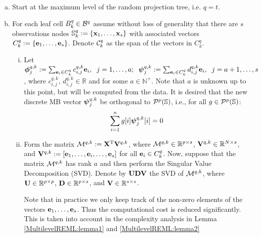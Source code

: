 \documentclass[11pt,final]{amsart}       %
\begin{document}
\begin{enumerate}[(a)]
\item Start at the maximum level of the random projection tree,
  i.e. $q = t$.
\item For each leaf cell $B^{q}_{k} \in {\mathcal B}^{q}$ assume without loss
  of generality that there are $s$ observations nodes $\mathbb{S}^{q}_{k}:=\{
  \mathbf{x}_1, \dots, \mathbf{x}_s \}$ with associated vectors $C_k^{q} := \{
  \mathbf{e}_1, \dots, \mathbf{e}_s \}$.
  Denote ${\mathcal C}^{q}_{k}$ as the span of the vectors in $C_k^{q}$.
\begin{enumerate}[i)]

\item Let $\boldsymbol{\phi}^{q,k} _{j} := \sum_{\mathbf{e}_i \in C^q_k} c^{q,k} _{i,j}
  \mathbf{e}_i, \hspace{2mm} j=1, \dots, a;
\hspace{2mm} \boldsymbol{\psi}^{q,k}_{j} := \sum_{\mathbf{e}_i \in C^q_k} d^{q,k}_{i,j}
\mathbf{e}_i, \hspace{2mm} j=a+1, \dots, s$, where $c^{q,k}_{i,j}$,
$d^{q,k}_{i,j} \in \mathbb{R}$ and for some $a \in \mathbb{N}^{+}$. Note
that $a$ is unknown up to this point, but will be computed from the
data.  It is desired that the new discrete MB vector $\boldsymbol{\psi}^{q,k}_{j}$
be orthogonal to ${\mathcal P}^{p}(\mathbb{S})$, i.e., for all $g \in {\mathcal P}^{
  p}(\mathbb{S})$:
\begin{equation}
\sum_{i=1}^{n} g[i] \boldsymbol{\psi}^{q,k}_{j}[i] = 0
\label{hbconstruction:eqn1}
\end{equation}

\item Form the matrix ${\mathcal M}^{q,k} := \mathbf{X} ^{\rm T} \mathbf{V}^{q,k}$, where
  ${\mathcal M}^{q,k} \in \Bbb{R}^{p \times s}$, $\mathbf{V}^{q,k} \in \Bbb{R}^{N \times s}$,
  and $\mathbf{V}^{q,k}: = [\mathbf{e}_1, \dots, \mathbf{e}_i, \dots,\mathbf{e}_s ]$ for all $\mathbf{e}_i
  \in C_k^q$. Now, suppose that the matrix ${\mathcal M}^{q,k} $ has rank $a$
  and then perform the Singular Value Decomposition (SVD). Denote by
  $\mathbf{U} \mathbf{D} \mathbf{V} $ the SVD of ${\mathcal M}^{q,k} $, where $\mathbf{U} \in \Bbb{R}^{ p \times
    p}$, $\mathbf{D} \in \Bbb{R}^{p \times s}$, and $\mathbf{V} \in \Bbb{R}^{s \times s} $.

  \begin{remark} Note that in practice we only keep track of the
    non-zero elements of the vectors $\mathbf{e}_1, \dots, \mathbf{e}_s$. Thus the
    computational cost is reduced significantly. This is taken into
    account in the complexity analysis in Lemma
    \ref{MultilevelREML:lemma1} and \ref{MultilevelREML:lemma2}
  \end{remark}
  

\end{enumerate}
\end{enumerate}
\end{document}
